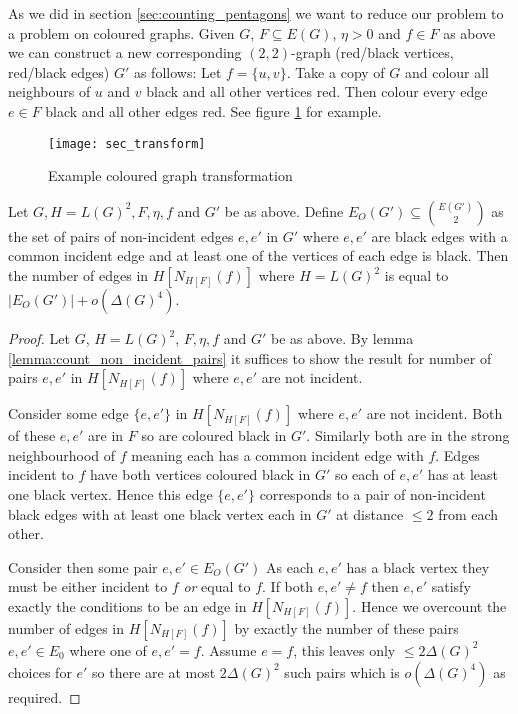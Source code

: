 As we did in section \ref{sec:counting_pentagons} we want to reduce our problem to a
problem on coloured graphs.
Given $G$, $F\subseteq E(G)$, $\eta > 0$ and $f \in F$ as above we can construct a
new corresponding $(2,2)$-graph (red/black vertices, red/black edges) $G'$ as follows:
Let $f=\{u, v\}$. Take a copy of $G$ and colour all neighbours of $u$ and $v$ black
and all other vertices red. Then colour every edge $e \in F$ black and all other
edges red. See figure \ref{fig:transform} for example.

\begin{figure}[ht]
    \centering
    \texttt{[image: sec\_transform]}
    \caption{Example coloured graph transformation}
    \label{fig:transform}
\end{figure}

\begin{lemma}
    \label{lemma:sec_black_edge_degree}
    Let $G, H=L(G)^2, F, \eta, f$ and $G'$ be as above.
    Define $E_O(G') \subseteq \binom{E(G')}{2}$ as the set of pairs of non-incident
    edges $e, e'$ in $G'$
    where $e, e'$ are black edges with a common incident edge and
    at least one of the vertices of each edge is black.
    Then the number of edges in $H[N_{H[F]}(f)]$
    where $H=L(G)^2$ is equal to $|E_O(G')| + o(\Delta(G)^4)$.
\end{lemma}

\begin{proof}
    Let $G$, $H=L(G)^2$, $F, \eta, f$ and $G'$ be as above.
    By lemma \ref{lemma:count_non_incident_pairs} it suffices to show the result for
    number of pairs $e,e'$ in $H[N_{H[F]}(f)]$ where $e,e'$ are not incident.

    Consider some edge $\{e, e'\}$ in
    $H[N_{H[F]}(f)]$ where $e,e'$ are not incident.
    Both of these $e,e'$ are in $F$ so are coloured black in $G'$.
    Similarly both are in the strong neighbourhood of $f$ meaning each has a common
    incident edge with $f$. Edges incident to $f$ have both vertices coloured black
    in $G'$ so each of $e, e'$ has at least one black vertex.
    Hence this edge $\{e, e'\}$ corresponds to a pair of non-incident black edges with at least one
    black vertex each in $G'$ at distance $\leq 2$ from each other.

    Consider then some pair $e,e' \in E_O(G')$
    As each $e,e'$ has a black vertex they must be either incident to $f$ \textit{or} equal
    to $f$. If both $e, e' \neq f$ then
    $e, e'$ satisfy exactly the conditions to be an edge in $H[N_{H[F]}(f)]$.
    Hence we overcount the number of edges in $H[N_{H[F]}(f)]$ by exactly the
    number of these pairs $e, e'\in E_0$ where one of $e, e' = f$. Assume $e=f$,
    this leaves only $\leq 2\Delta(G)^2$ choices for $e'$ so there are at most
    $2\Delta(G)^2$ such pairs which is $o(\Delta(G)^4)$ as required.
\end{proof}

